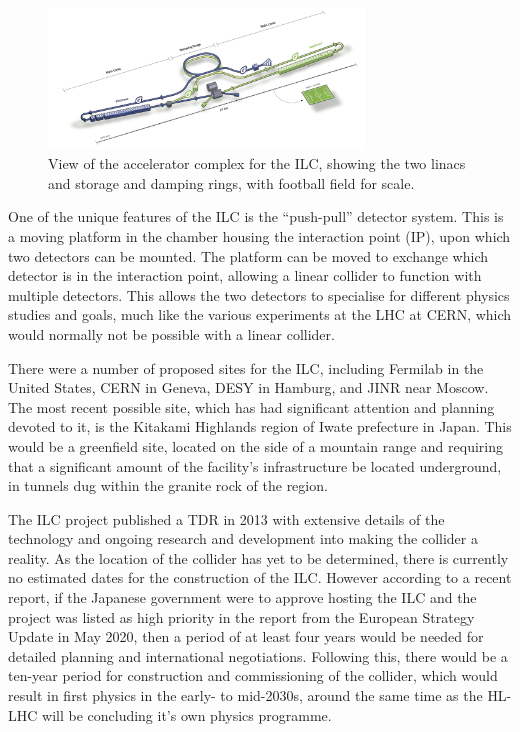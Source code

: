 \begin{figure}[h]
	\centering
	\includegraphics[width=0.75\textwidth]{../Pictures/ILC-Schematic.jpg}
	\caption{View of the accelerator complex for the \acrlong{ILC}, showing the two linacs and storage and damping rings, with football field for scale.}
	\label{figure:colliders/ILC/main}
\end{figure}

One of the unique features of the \acrshort{ILC} is the ``push-pull'' detector system. This is a moving platform in the chamber housing the interaction point (\acrshort{IP}), upon which two detectors can be mounted. The platform can be moved to exchange which detector is in the interaction point, allowing a linear collider to function with multiple detectors. This allows the two detectors to specialise for different physics studies and goals, much like the various experiments at the \acrshort{LHC} at \acrshort{CERN}, which would normally not be possible with a linear collider.

There were a number of proposed sites for the \acrshort{ILC}, including Fermilab in the United States, \acrshort{CERN} in Geneva, \acrshort{DESY} in Hamburg, and \acrshort{JINR} near Moscow. The most recent possible site, which has had significant attention and planning devoted to it, is the Kitakami Highlands region of Iwate prefecture in Japan. This would be a greenfield site, located on the side of a mountain range and requiring that a significant amount of the facility's infrastructure be located underground, in tunnels dug within the granite rock of the region. 

The \acrshort{ILC} project published a \acrfull{TDR} in 2013 with extensive details of the technology and ongoing research and development into making the collider a reality. As the location of the collider has yet to be determined, there is currently no estimated dates for the construction of the \acrshort{ILC}. However according to a recent report\cite{ilc-timeline-2019}, if the Japanese government were to approve hosting the \acrshort{ILC} and the project was listed as high priority in the report from the European Strategy Update in May 2020, then a period of at least four years would be needed for detailed planning and international negotiations. Following this, there would be a ten-year period for construction and commissioning of the collider, which would result in first physics in the early- to mid-2030s, around the same time as the \acrshort{HL-LHC} will be concluding it's own physics programme.

